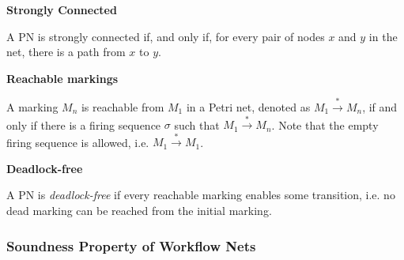 \documentclass[12pt]{article}
\begin{document}
    \begin{definition} \textbf{Strongly Connected} \cite{malinao-rdlt}

    A PN is strongly connected if, and only if, for every pair of nodes $x$ and $y$ in the net, there is a path from $x$ to $y$.

    \end{definition}

    \begin{definition} \textbf{Reachable markings} \cite{malinao-rdlt}

    A marking $M_{n}$ is reachable from $M_{1}$ in a Petri net, denoted as $M_{1} \overset{*}{\rightarrow} M_{n}$, if and only if there is a firing sequence $\sigma$ such that $M_{1} \overset{*}{\rightarrow} M_{n}$. Note that the empty firing sequence is allowed, i.e. $M_{1} \overset{*}{\rightarrow} M_{1}$.

    \end{definition}

    \begin{definition} \textbf{Deadlock-free} \cite{malinao-rdlt}

    A PN is \textit{deadlock-free} if every reachable marking enables some transition, i.e. no dead marking can be reached from the initial marking.

    \end{definition}

    \subsubsection*{Soundness Property of Workflow Nets}
\end{document}
